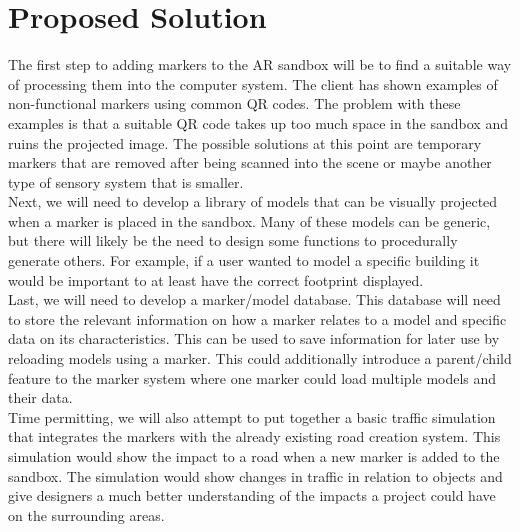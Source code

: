 \documentclass[letterpaper, 10pt, onecolumn, draftclsnofoot]{IEEEtran}
\begin{document}
\section{Proposed Solution}
The first step to adding markers to the AR sandbox will be to find a suitable way of processing them into the computer system. The client has shown examples of non-functional markers using common QR codes. The problem with these examples is that a suitable QR code takes up too much space in the sandbox and ruins the projected image. The possible solutions at this point are temporary markers that are removed after being scanned into the scene or maybe another type of sensory system that is smaller.\\
Next, we will need to develop a library of models that can be visually projected when a marker is placed in the sandbox. Many of these models can be generic, but there will likely be the need to design some functions to procedurally generate others. For example, if a user wanted to model a specific building it would be important to at least have the correct footprint displayed.\\
Last, we will need to develop a marker/model database. This database will need to store the relevant information on how a marker relates to a model and specific data on its characteristics. This can be used to save information for later use by reloading models using a marker. This could additionally introduce a parent/child feature to the marker system where one marker could load multiple models and their data.\\
Time permitting, we will also attempt to put together a basic traffic simulation that integrates the markers with the already existing road creation system. This simulation would show the impact to a road when a new marker is added to the sandbox. The simulation would show changes in traffic in relation to objects and give designers a much better understanding of the impacts a project could have on the surrounding areas.\\ 
\end{document}
